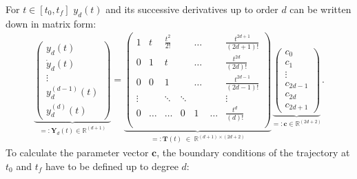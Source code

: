 \documentclass[a4paper,12pt,headinclude=true,headsepline,parskip=half,DIV=12]{scrartcl}
\newcommand{\R}{\mathbb{R}} %
\begin{document}
For $t \in [t_0, t_f]$ $y_d(t)$ and its successive derivatives up to order $d$ can be written down in matrix form:
\begin{align}
  \label{eq:TMatrixFull}
  \underbrace{\begin{pmatrix}
                  y_d(t) \\ \dot{y}_d(t) \\ \vdots \\ y_d^{(d-1)}(t) \\ y_d^{(d)}(t)
                \end{pmatrix}}_{=:\mathbf{Y}_d(t) \in \R^{(d+1)}}
  =\underbrace{\begin{pmatrix}
                   1      & t      & \frac{t^2}{2!} &        & \hdots &        & \frac{t^{2d+1}}{(2d+1)!} \\[1ex]
                   0      & 1      & t              &        & \hdots &        & \frac{t^{2d}}{(2d)!}     \\[1ex]
                   0      & 0      & 1              &        & \hdots &        & \frac{t^{2d-1}}{(2d-1)!} \\[1ex]
                   \vdots &        & \ddots         & \ddots &        &        & \vdots                   \\[1ex]
                   0      & \hdots & \hdots         & 0      & 1      & \hdots & \frac{t^{d}}{(d)!}       \\[1ex]
                 \end{pmatrix}}_{=:\mathbf{T}(t) \;\in \; \R^{(d+1)\times (2d+2)}}
  \underbrace{
    \begin{pmatrix}
      c_0 \\ c_1 \\ \vdots \\ c_{2d-1}\\ c_{2d}\\ c_{2d+1}
    \end{pmatrix}}_{=:\mathbf{c}\in \R^{(2d+2)}}.
\end{align}
To calculate the parameter vector $\mathbf{c}$, the boundary conditions of the trajectory at $t_0$ and $t_f$ have to be defined up to degree $d$:
\end{document}
